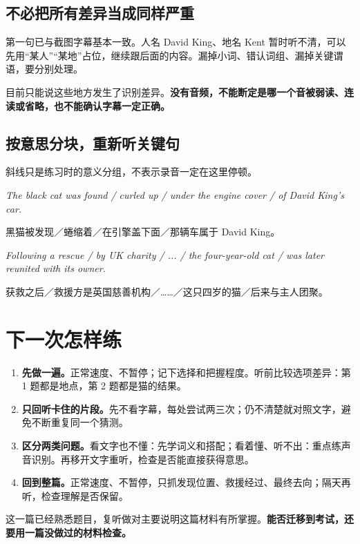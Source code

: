 \documentclass[UTF8,a4paper,11pt,fontset=fandol]{ctexart}
\newcommand{\en}[1]{\textit{#1}}
\begin{document}
\subsection{不必把所有差异当成同样严重}
第一句已与截图字幕基本一致。人名 David King、地名 Kent 暂时听不清，可以先用“某人”“某地”占位，继续跟后面的内容。漏掉小词、错认词组、漏掉关键谓语，要分别处理。

目前只能说这些地方发生了识别差异。\textbf{没有音频，不能断定是哪一个音被弱读、连读或省略，也不能确认字幕一定正确。}

\subsection{按意思分块，重新听关键句}
斜线只是练习时的意义分组，不表示录音一定在这里停顿。

\en{The black cat was found / curled up / under the engine cover / of David King's car.}

黑猫被发现／蜷缩着／在引擎盖下面／那辆车属于 David King。

\en{Following a rescue / by UK charity / ... / the four-year-old cat / was later reunited with its owner.}

获救之后／救援方是英国慈善机构／……／这只四岁的猫／后来与主人团聚。

\newpage
\section{下一次怎样练}
\begin{enumerate}
\item \textbf{先做一遍。}正常速度、不暂停；记下选择和把握程度。听前比较选项差异：第 1 题都是地点，第 2 题都是猫的结果。
\item \textbf{只回听卡住的片段。}先不看字幕，每处尝试两三次；仍不清楚就对照文字，避免不断重复同一个猜测。
\item \textbf{区分两类问题。}看文字也不懂：先学词义和搭配；看着懂、听不出：重点练声音识别。再移开文字重听，检查是否能直接获得意思。
\item \textbf{回到整篇。}正常速度、不暂停，只抓发现位置、救援经过、最终去向；隔天再听，检查理解是否保留。
\end{enumerate}

这一篇已经熟悉题目，复听做对主要说明这篇材料有所掌握。\textbf{能否迁移到考试，还要用一篇没做过的材料检查。}
\end{document}
